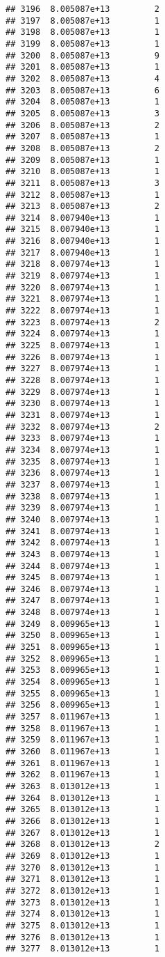 \documentclass[
]{article}
\begin{document}
\begin{verbatim}
## 3196  8.005087e+13         2
## 3197  8.005087e+13         1
## 3198  8.005087e+13         1
## 3199  8.005087e+13         1
## 3200  8.005087e+13         9
## 3201  8.005087e+13         1
## 3202  8.005087e+13         4
## 3203  8.005087e+13         6
## 3204  8.005087e+13         1
## 3205  8.005087e+13         3
## 3206  8.005087e+13         2
## 3207  8.005087e+13         1
## 3208  8.005087e+13         2
## 3209  8.005087e+13         1
## 3210  8.005087e+13         1
## 3211  8.005087e+13         3
## 3212  8.005087e+13         1
## 3213  8.005087e+13         2
## 3214  8.007940e+13         1
## 3215  8.007940e+13         1
## 3216  8.007940e+13         1
## 3217  8.007940e+13         1
## 3218  8.007974e+13         1
## 3219  8.007974e+13         1
## 3220  8.007974e+13         1
## 3221  8.007974e+13         1
## 3222  8.007974e+13         1
## 3223  8.007974e+13         2
## 3224  8.007974e+13         1
## 3225  8.007974e+13         1
## 3226  8.007974e+13         1
## 3227  8.007974e+13         1
## 3228  8.007974e+13         1
## 3229  8.007974e+13         1
## 3230  8.007974e+13         1
## 3231  8.007974e+13         1
## 3232  8.007974e+13         2
## 3233  8.007974e+13         1
## 3234  8.007974e+13         1
## 3235  8.007974e+13         1
## 3236  8.007974e+13         1
## 3237  8.007974e+13         1
## 3238  8.007974e+13         1
## 3239  8.007974e+13         1
## 3240  8.007974e+13         1
## 3241  8.007974e+13         1
## 3242  8.007974e+13         1
## 3243  8.007974e+13         1
## 3244  8.007974e+13         1
## 3245  8.007974e+13         1
## 3246  8.007974e+13         1
## 3247  8.007974e+13         1
## 3248  8.007974e+13         1
## 3249  8.009965e+13         1
## 3250  8.009965e+13         1
## 3251  8.009965e+13         1
## 3252  8.009965e+13         1
## 3253  8.009965e+13         1
## 3254  8.009965e+13         1
## 3255  8.009965e+13         1
## 3256  8.009965e+13         1
## 3257  8.011967e+13         1
## 3258  8.011967e+13         1
## 3259  8.011967e+13         1
## 3260  8.011967e+13         1
## 3261  8.011967e+13         1
## 3262  8.011967e+13         1
## 3263  8.013012e+13         1
## 3264  8.013012e+13         1
## 3265  8.013012e+13         1
## 3266  8.013012e+13         1
## 3267  8.013012e+13         1
## 3268  8.013012e+13         2
## 3269  8.013012e+13         1
## 3270  8.013012e+13         1
## 3271  8.013012e+13         1
## 3272  8.013012e+13         1
## 3273  8.013012e+13         1
## 3274  8.013012e+13         1
## 3275  8.013012e+13         1
## 3276  8.013012e+13         1
## 3277  8.013012e+13         1

\end{verbatim}
\end{document}
